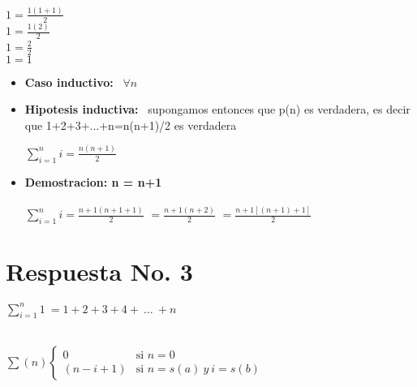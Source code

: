 \documentclass[10pt,a4paper]{article}
\begin{document}
\begin{center}
\
\\ $ 1 = \frac{1(1+1)}{2} $
\
\\ $ 1 = \frac{1(2)}{2}$
\
\\ $ 1 = \frac{2}{2}$
\
\\ $ 1 = 1 $
\end{center}
\begin{itemize}
\item\textbf{Caso inductivo: } \ $ \forall n $
\item\textbf{Hipotesis inductiva: } \ supongamos entonces que p(n) es verdadera, es decir que 1+2+3+...+n=n(n+1)/2 es verdadera
\begin{center}

$ \sum_{i=1}^{n}{i}=\frac{n(n+1)}{2} $
\end{center}
\item\textbf{Demostracion: n = n+1}
\\
\\
$ \sum_{i=1}^{n}{i}= \frac{n+1(n+1+1)}{2} $
$					= \frac{n+1(n+2)}{2} $
$					= \frac{n+1 [(n+1)+1]}{2} $
\
\end{itemize}
\section*{Respuesta No. 3}
\begin{center}
$ \sum_{i=1}^{n}{1} \ =1+2+3+4+\ \ldots\ +n $

\
\\ $ \sum(n)   \left\{
                        \begin{array}{ll}
                                0  & \mbox{si } n = 0 \\
                                (n-i+1) & \mbox{si } n = s(a) \ y \ i=s(b)
                        \end{array}
                \right.
$
\end{center}
\end{document}
